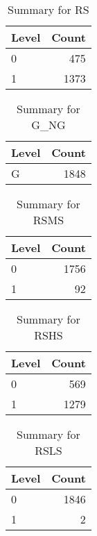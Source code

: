 \begin{table}[ht]
\centering
\begin{tabular}{lr}
  \hline
Level & Count \\ 
  \hline
0 & 475 \\ 
  1 & 1373 \\ 
   \hline
\end{tabular}
\caption{Summary for RS} 
\label{tab: RS}
\end{table}
\begin{table}[ht]
\centering
\begin{tabular}{lr}
  \hline
Level & Count \\ 
  \hline
G & 1848 \\ 
   \hline
\end{tabular}
\caption{Summary for G_NG} 
\label{tab: G_NG}
\end{table}
\begin{table}[ht]
\centering
\begin{tabular}{lr}
  \hline
Level & Count \\ 
  \hline
0 & 1756 \\ 
  1 &  92 \\ 
   \hline
\end{tabular}
\caption{Summary for RSMS} 
\label{tab: RSMS}
\end{table}
\begin{table}[ht]
\centering
\begin{tabular}{lr}
  \hline
Level & Count \\ 
  \hline
0 & 569 \\ 
  1 & 1279 \\ 
   \hline
\end{tabular}
\caption{Summary for RSHS} 
\label{tab: RSHS}
\end{table}
\begin{table}[ht]
\centering
\begin{tabular}{lr}
  \hline
Level & Count \\ 
  \hline
0 & 1846 \\ 
  1 &   2 \\ 
   \hline
\end{tabular}
\caption{Summary for RSLS} 
\label{tab: RSLS}
\end{table}
